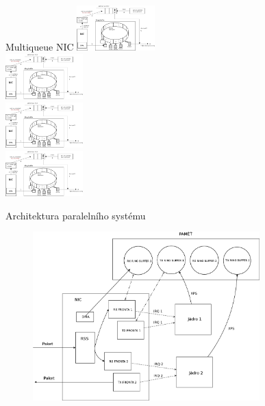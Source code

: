\documentclass{beamer}
\begin{document}
\begin{frame}{Multiqueue NIC}
	\centering
	\includegraphics[width=3cm,keepaspectratio]{fig/napi-workflow.png} \\
	\includegraphics[width=3cm,keepaspectratio]{fig/napi-workflow.png} \\
	\includegraphics[width=3cm,keepaspectratio]{fig/napi-workflow.png} \\
	\includegraphics[width=3cm,keepaspectratio]{fig/napi-workflow.png} \\
\end{frame}

\begin{frame}{Architektura paralelního systému}
		\begin{figure}
			\centering
			\includegraphics[width=8.75cm,keepaspectratio]{fig/arch.png}
		\end{figure}
\end{frame}
\end{document}
